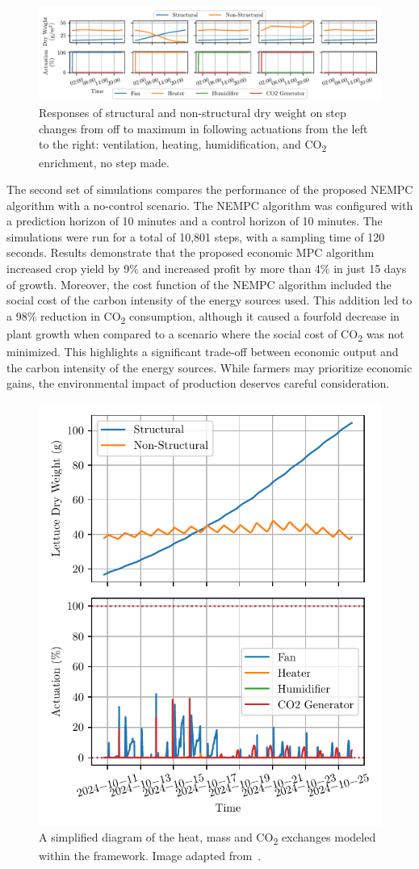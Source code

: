 \documentclass[conference]{IEEEtran}
\begin{document}
\begin{figure}
    \centering
    \includegraphics[width=\textwidth]{figures/step_response-outputs-2024-10-11_2024-10-26-120s.pdf}
    \caption{Responses of structural and non-structural dry weight on step changes from off to maximum in following actuations from the left to the right: ventilation, heating, humidification, and CO\textsubscript{2} enrichment, no step made.}\label{fig:steps}
\end{figure}


The second set of simulations compares the performance of the proposed NEMPC algorithm with a no-control scenario. The NEMPC algorithm was configured with a prediction horizon of 10 minutes and a control horizon of 10 minutes. The simulations were run for a total of 10,801 steps, with a sampling time of 120 seconds. Results demonstrate that the proposed economic MPC algorithm increased crop yield by 9\% and increased profit by more than 4\% in just 15 days of growth.
Moreover, the cost function of the NEMPC algorithm included the social cost of the carbon intensity of the energy sources used. This addition led to a 98\% reduction in CO\textsubscript{2} consumption, although it caused a fourfold decrease in plant growth when compared to a scenario where the social cost of CO\textsubscript{2} was not minimized. This highlights a significant trade-off between economic output and the carbon intensity of the energy sources. While farmers may prioritize economic gains, the environmental impact of production deserves careful consideration.

\begin{figure}\label{fig:control}
    \centering
    \includegraphics[width=.5\textwidth]{figures/greenhouse_control-mpc-N_5-steps_10801.pdf}
    \caption{A simplified diagram of the heat, mass and CO\textsubscript{2} exchanges modeled within the framework. Image adapted from~\cite{rmward61_2019}.}
\end{figure}
\end{document}
